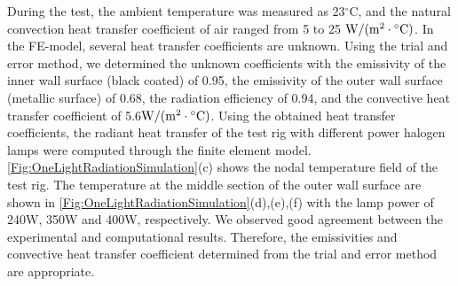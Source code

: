 
During the test, the ambient temperature was measured as 23$^{\circ}$C, and the natural convection heat transfer coefficient of air ranged from 5 to 25 ${\rm{W/}}({\rm{m}^{2}} \cdot {}^ \circ {\rm{C}})$.
In the FE-model, several heat transfer coefficients are unknown.
Using the trial and error method, we determined the unknown coefficients with the emissivity of the inner wall surface (black coated) of 0.95, the emissivity of the outer wall surface (metallic surface) of 0.68, the radiation efficiency of 0.94, and the convective heat transfer coefficient of 5.6${\rm{W/}}({\rm{m}^{2}} \cdot {}^ \circ {\rm{C}})$.
Using the obtained heat transfer coefficients, the radiant heat transfer of the test rig with different power halogen lamps were computed through the finite element model. 
\ref{Fig:OneLightRadiationSimulation}(c) shows the nodal temperature field of the test rig. 
The temperature at the middle section of the outer wall surface are shown in \ref{Fig:OneLightRadiationSimulation}(d),(e),(f) with the lamp power of 240W, 350W and 400W, respectively.
We observed good agreement between the experimental and computational results.
Therefore, the emissivities and convective heat transfer coefficient determined from the trial and error method are appropriate.




